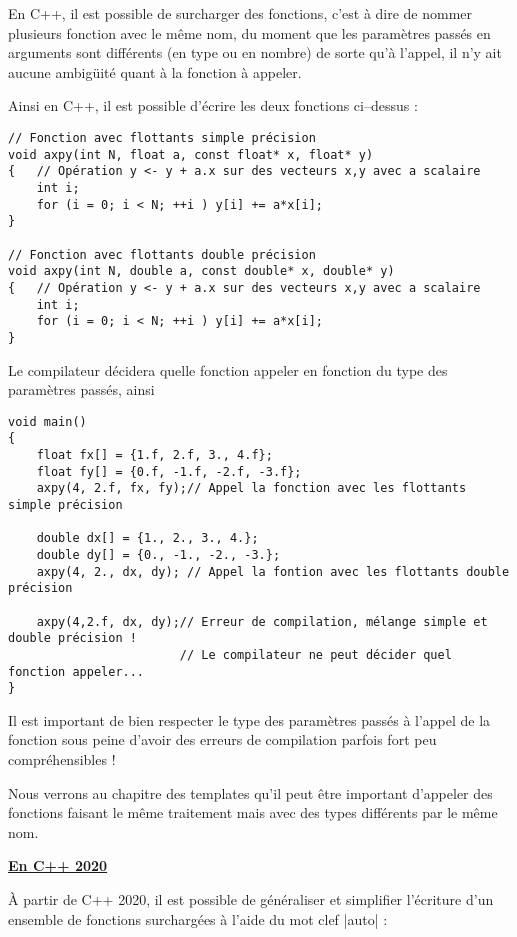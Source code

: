 En C++, il est possible de surcharger des fonctions, c'est à dire de nommer plusieurs fonction avec le même nom, du moment
que les paramètres passés en arguments sont différents (en type ou en nombre) de sorte qu'à l'appel, il n'y ait aucune
ambigüité quant à la fonction à appeler.

Ainsi en C++, il est possible d'écrire les deux fonctions ci--dessus :
\begin{lstlisting}[caption=Exemple de surcharge d'une fonction C++]
// Fonction avec flottants simple précision
void axpy(int N, float a, const float* x, float* y)
{   // Opération y <- y + a.x sur des vecteurs x,y avec a scalaire
    int i;
    for (i = 0; i < N; ++i ) y[i] += a*x[i];
}

// Fonction avec flottants double précision
void axpy(int N, double a, const double* x, double* y)
{   // Opération y <- y + a.x sur des vecteurs x,y avec a scalaire
    int i;
    for (i = 0; i < N; ++i ) y[i] += a*x[i];
}
\end{lstlisting}

Le compilateur décidera quelle fonction appeler en fonction du type des paramètres passés, ainsi
\begin{lstlisting}[caption=Appel à des fonctions surchargées]
void main()
{
    float fx[] = {1.f, 2.f, 3., 4.f};
    float fy[] = {0.f, -1.f, -2.f, -3.f};
    axpy(4, 2.f, fx, fy);// Appel la fonction avec les flottants simple précision

    double dx[] = {1., 2., 3., 4.};
    double dy[] = {0., -1., -2., -3.};
    axpy(4, 2., dx, dy); // Appel la fontion avec les flottants double précision

    axpy(4,2.f, dx, dy);// Erreur de compilation, mélange simple et double précision !
                        // Le compilateur ne peut décider quel fonction appeler...
}
\end{lstlisting}

Il est important de bien respecter le type des paramètres passés à l'appel de la fonction sous peine d'avoir des erreurs de compilation parfois fort peu compréhensibles !

Nous verrons au chapitre des templates qu'il peut être important d'appeler des fonctions faisant le même traitement mais avec des types différents par le même nom.

\underline{\textbf{En C++ 2020}}

À partir de C++ 2020, il est possible de généraliser et simplifier l'écriture d'un ensemble de fonctions surchargées
à l'aide du mot clef |auto| :

